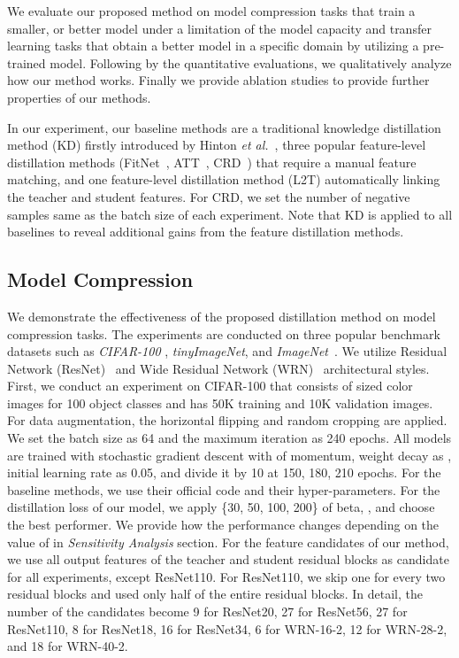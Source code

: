 We evaluate our proposed method on model compression tasks that train a smaller, or better model under a limitation of the model capacity and transfer learning tasks that obtain a better model in a specific domain by utilizing a pre-trained model. Following by the quantitative evaluations, we qualitatively analyze how our method works. Finally we provide ablation studies to provide further properties of our methods. 

In our experiment, our baseline methods are a traditional knowledge distillation method (KD) firstly introduced by Hinton \textit{et al.}~\cite{hinton2015distilling}, three popular feature-level distillation methods (FitNet~\cite{fitnets}, ATT~\cite{atts}, CRD~\cite{crd}) that require a manual feature matching, and one feature-level distillation method (L2T) automatically linking the teacher and student features. For CRD, we set the number of negative samples same as the batch size of each experiment. Note that KD is applied to all baselines to reveal additional gains from the feature distillation methods. 

\subsection{Model Compression}

We demonstrate the effectiveness of the proposed distillation method on model compression tasks. The experiments are conducted on three popular benchmark datasets such as \textit{CIFAR-100} \cite{cifar100}, \textit{tinyImageNet}, and \textit{ImageNet}~\cite{imagenet}. We utilize Residual Network (ResNet)~\cite{resnet} and Wide Residual Network (WRN)~\cite{wrn} architectural styles. First, we conduct an experiment on CIFAR-100 that consists of  sized color images for 100 object classes and has 50K training and 10K validation images. For data augmentation, the horizontal flipping and random cropping are applied. We set the batch size as 64 and the maximum iteration as 240 epochs. All models are trained with stochastic gradient descent with  of momentum, weight decay as , initial learning rate as 0.05, and divide it by 10 at 150, 180, 210 epochs. For the baseline methods, we use their official code and their hyper-parameters. For the distillation loss of our model, we apply \{30, 50, 100, 200\} of beta, , and choose the best performer. We provide how the performance changes depending on the value of  in \textit{Sensitivity Analysis} section. For the feature candidates of our method, we use all output features of the teacher and student residual blocks as candidate for all experiments, except ResNet110. 
For ResNet110, we skip one for every two residual blocks and used only half of the entire residual blocks.
In detail, the number of the candidates become 9 for ResNet20, 27 for ResNet56, 27 for ResNet110, 8 for ResNet18, 16 for ResNet34, 6 for WRN-16-2, 12 for WRN-28-2, and 18 for WRN-40-2.

